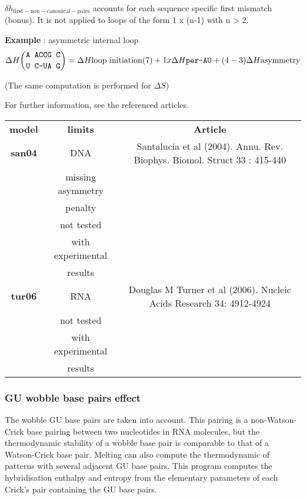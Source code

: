 \documentclass{article}
\begin{document}
$\delta{}h_\mathrm{first-non-canonical-pairs}$ accounts for each sequence
specific first mismatch (bonus). It is not applied to loops of the form 1 x (n-1) with
n > 2.


\textbf{Example} : asymmetric internal loop
\begin{multline*}
\Delta H {\mbox{\texttt{A ACCG C}} \choose \mbox{\texttt{U C-UA G}}} = 
\Delta H {\mbox{loop initiation(7)}} +
1 x \Delta H {\mbox{\texttt{per-AU}}} +
(4 - 3)\Delta H {\mbox{asymmetry}}\\
\end{multline*}

       (The same computation is performed for $\Delta S$)    
       
For further information, see the referenced articles.

\begin{table}[h]
\begin{tabular}[h]{| c | c | c |}
\textbf{model} & \textbf{limits} & \textbf{Article} \\
\textbf{san04} & DNA & Santalucia et al (2004). Annu. Rev. Biophys. Biomol. Struct 33 : 415-440\\
 & missing asymmetry & \\
 & penalty & \\
 & not tested & \\
 & with experimental & \\
 & results & \\
\textbf{tur06} & RNA & Douglas M Turner et al (2006). Nucleic Acids Research 34: 4912-4924 \\
 & not tested & \\
 & with experimental & \\
 & results & \\
\end{tabular}
\end{table}

\subsubsection{GU wobble base pairs effect}

The wobble GU base pairs are taken into account. This pairing is a non-Watson-Crick base pairing between two nucleotides 
in RNA molecules, but the thermodynamic stability of a wobble base pair is comparable to that of a Watson-Crick base pair.
Melting can also compute the thermodynamic of patterns with several adjacent GU base pairs.
This program computes the hybridisation enthalpy and entropy from the elementary 
parameters of each Crick's pair containing the GU base pairs.
\end{document}
